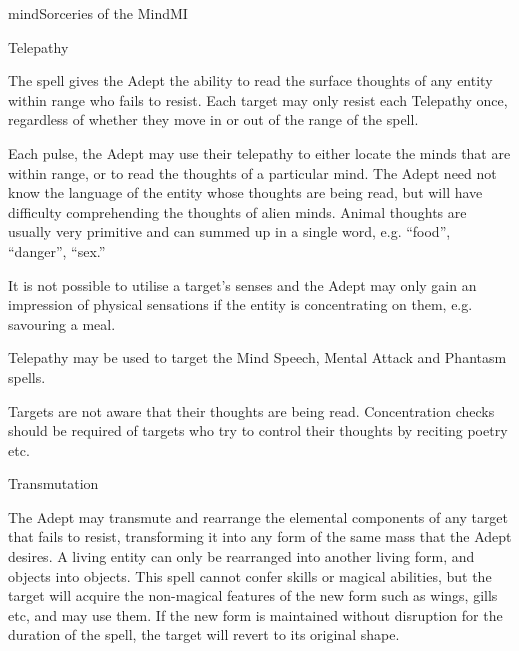 \begin{College}[1.6]{mind}{Sorceries of the Mind}{MI}
\begin{spell}[S-9]{Telepathy}
\begin{effects}
The spell gives the Adept the ability to read the surface thoughts of
any entity within range who fails to resist. Each target may only
resist each Telepathy once, regardless of whether they move in or out
of the range of the spell.

Each pulse, the Adept may use their telepathy to either locate the
minds that are within range, or to read the thoughts of a particular
mind.  The Adept need not know the language of the entity whose
thoughts are being read, but will have difficulty comprehending the
thoughts of alien minds.  Animal thoughts are usually very primitive
and can summed up in a single word, e.g. “food”, “danger”, “sex.”

It is not possible to utilise a target’s senses and the Adept may only
gain an impression of physical sensations if the entity is
concentrating on them, e.g. savouring a meal.

Telepathy may be used to target the Mind Speech, Mental Attack and
Phantasm spells.

Targets are not aware that their thoughts are being read.
Concentration checks should be required of targets who try to control
their thoughts by reciting poetry etc.
\end{effects}
\end{spell}

\begin{spell}[S-10]{Transmutation}

\begin{effects}
The Adept may transmute and rearrange the elemental components of any
target that fails to resist, transforming it into any form of the same
mass that the Adept desires.  A living entity can only be rearranged
into another living form, and objects into objects. This spell cannot
confer skills or magical abilities, but the target will acquire the
non-magical features of the new form such as wings, gills etc, and may
use them. If the new form is maintained without disruption for the
duration of the spell, the target will revert to its original shape.
\end{effects}
\end{spell}

\end{College}
